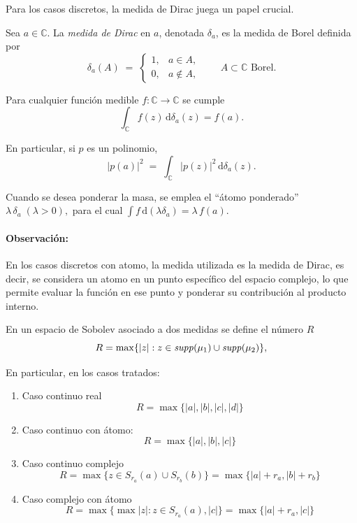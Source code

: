 Para los casos discretos, la medida de Dirac juega un papel crucial.

\begin{definition}\label{def:dirac_measure}
	Sea $a\in\mathbb{C}$.
	La \emph{medida de Dirac} en $a$, denotada $\delta_{a}$, es la medida de Borel definida por
	\[
		\delta_{a}(A)\;=\;
		\begin{cases}
			1, & a\in A,    \\
			0, & a\notin A,
		\end{cases}
		\qquad A\subset\mathbb C \text{ Borel}.
	\]

	Para cualquier función medible \(f\colon\mathbb{C}\to\mathbb{C}\) se cumple
	\[
		\int_{\mathbb C} f(z)\,\mathrm d\delta_{a}(z)=f(a).
	\]

	En particular, si \(p\) es un polinomio,
	\[
		|p(a)|^{2}\;=\;
		\int_{\mathbb C} |p(z)|^{2}\,\mathrm d\delta_{a}(z).
	\]

	Cuando se desea ponderar la masa, se emplea el “átomo ponderado”
	\(
	\lambda\,\delta_{a}\;( \lambda>0),
	\)
	para el cual
	\(
	\displaystyle \int f\,\mathrm d(\lambda\delta_{a})=\lambda\,f(a).
	\)
\end{definition}

\paragraph{Observación:}
En los casos discretos con atomo, la medida utilizada es la medida de Dirac, es decir, se considera un atomo en un punto específico del espacio complejo, lo que permite evaluar la función en ese punto y ponderar su contribución al producto interno.

\begin{definition}
	\label{rem:R_support}
	\noindent En un espacio de Sobolev asociado a dos medidas se define el número  $R$
	$$
		R= \max \{ \vert z \vert : z\in {\it supp}(\mu_1)\cup {\it supp}(\mu_2)\},
	$$
\end{definition}
\noindent En particular, en los casos tratados:
\begin{enumerate}
	\item Caso continuo real
	      $$
		      R= \max \{ \vert a \vert,\vert b \vert, \vert c \vert, \vert d \vert\}
	      $$
	\item Caso continuo con átomo:
	      $$
		      R= \max \{\vert a \vert, \vert b \vert, \vert c \vert\}
	      $$
	\item Caso continuo complejo
	      $$
		      R=\max \{ z \in S_{r_a}(a)\cup S_{r_b}(b)\}= \max \{ \vert a \vert + r_{a}, \vert b \vert + r_b \}
	      $$
	\item Caso complejo con átomo
	      $$
		      R= \max\{ \max{\vert z \vert : z\in S_{r_a}(a)}, \vert c \vert \}= \max \{ \vert a \vert + r_a,\vert c \vert \}
	      $$
\end{enumerate}

